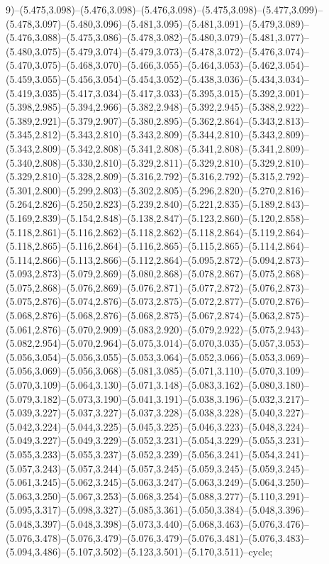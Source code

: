 9)--(5.475,3.098)--(5.476,3.098)--(5.476,3.098)--(5.475,3.098)--(5.477,3.099)--(5.478,3.097)--(5.480,3.096)--(5.481,3.095)--(5.481,3.091)--(5.479,3.089)--(5.476,3.088)--(5.475,3.086)--(5.478,3.082)--(5.480,3.079)--(5.481,3.077)--(5.480,3.075)--(5.479,3.074)--(5.479,3.073)--(5.478,3.072)--(5.476,3.074)--(5.470,3.075)--(5.468,3.070)--(5.466,3.055)--(5.464,3.053)--(5.462,3.054)--(5.459,3.055)--(5.456,3.054)--(5.454,3.052)--(5.438,3.036)--(5.434,3.034)--(5.419,3.035)--(5.417,3.034)--(5.417,3.033)--(5.395,3.015)--(5.392,3.001)--(5.398,2.985)--(5.394,2.966)--(5.382,2.948)--(5.392,2.945)--(5.388,2.922)--(5.389,2.921)--(5.379,2.907)--(5.380,2.895)--(5.362,2.864)--(5.343,2.813)--(5.345,2.812)--(5.343,2.810)--(5.343,2.809)--(5.344,2.810)--(5.343,2.809)--(5.343,2.809)--(5.342,2.808)--(5.341,2.808)--(5.341,2.808)--(5.341,2.809)--(5.340,2.808)--(5.330,2.810)--(5.329,2.811)--(5.329,2.810)--(5.329,2.810)--(5.329,2.810)--(5.328,2.809)--(5.316,2.792)--(5.316,2.792)--(5.315,2.792)--(5.301,2.800)--(5.299,2.803)--(5.302,2.805)--(5.296,2.820)--(5.270,2.816)--(5.264,2.826)--(5.250,2.823)--(5.239,2.840)--(5.221,2.835)--(5.189,2.843)--(5.169,2.839)--(5.154,2.848)--(5.138,2.847)--(5.123,2.860)--(5.120,2.858)--(5.118,2.861)--(5.116,2.862)--(5.118,2.862)--(5.118,2.864)--(5.119,2.864)--(5.118,2.865)--(5.116,2.864)--(5.116,2.865)--(5.115,2.865)--(5.114,2.864)--(5.114,2.866)--(5.113,2.866)--(5.112,2.864)--(5.095,2.872)--(5.094,2.873)--(5.093,2.873)--(5.079,2.869)--(5.080,2.868)--(5.078,2.867)--(5.075,2.868)--(5.075,2.868)--(5.076,2.869)--(5.076,2.871)--(5.077,2.872)--(5.076,2.873)--(5.075,2.876)--(5.074,2.876)--(5.073,2.875)--(5.072,2.877)--(5.070,2.876)--(5.068,2.876)--(5.068,2.876)--(5.068,2.875)--(5.067,2.874)--(5.063,2.875)--(5.061,2.876)--(5.070,2.909)--(5.083,2.920)--(5.079,2.922)--(5.075,2.943)--(5.082,2.954)--(5.070,2.964)--(5.075,3.014)--(5.070,3.035)--(5.057,3.053)--(5.056,3.054)--(5.056,3.055)--(5.053,3.064)--(5.052,3.066)--(5.053,3.069)--(5.056,3.069)--(5.056,3.068)--(5.081,3.085)--(5.071,3.110)--(5.070,3.109)--(5.070,3.109)--(5.064,3.130)--(5.071,3.148)--(5.083,3.162)--(5.080,3.180)--(5.079,3.182)--(5.073,3.190)--(5.041,3.191)--(5.038,3.196)--(5.032,3.217)--(5.039,3.227)--(5.037,3.227)--(5.037,3.228)--(5.038,3.228)--(5.040,3.227)--(5.042,3.224)--(5.044,3.225)--(5.045,3.225)--(5.046,3.223)--(5.048,3.224)--(5.049,3.227)--(5.049,3.229)--(5.052,3.231)--(5.054,3.229)--(5.055,3.231)--(5.055,3.233)--(5.055,3.237)--(5.052,3.239)--(5.056,3.241)--(5.054,3.241)--(5.057,3.243)--(5.057,3.244)--(5.057,3.245)--(5.059,3.245)--(5.059,3.245)--(5.061,3.245)--(5.062,3.245)--(5.063,3.247)--(5.063,3.249)--(5.064,3.250)--(5.063,3.250)--(5.067,3.253)--(5.068,3.254)--(5.088,3.277)--(5.110,3.291)--(5.095,3.317)--(5.098,3.327)--(5.085,3.361)--(5.050,3.384)--(5.048,3.396)--(5.048,3.397)--(5.048,3.398)--(5.073,3.440)--(5.068,3.463)--(5.076,3.476)--(5.076,3.478)--(5.076,3.479)--(5.076,3.479)--(5.076,3.481)--(5.076,3.483)--(5.094,3.486)--(5.107,3.502)--(5.123,3.501)--(5.170,3.511)--cycle;
